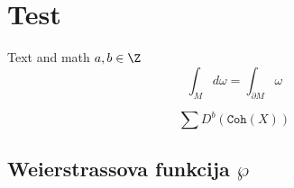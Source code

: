 \section{Test}
Text and math $a, b \in \Z$
\[
\int_{M} d\omega = \int_{\partial M } \omega
\]

\[
    \sum D^b(\mathtt{Coh}(X))
\]







\subsection{Weierstrassova funkcija $\wp$}


